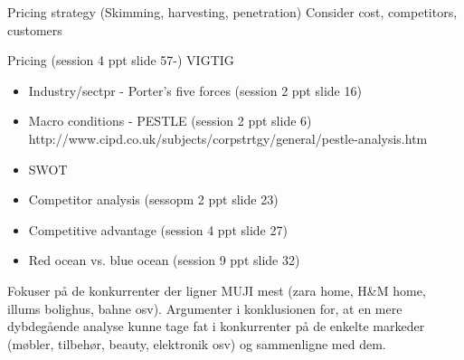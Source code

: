 Pricing strategy (Skimming, harvesting, penetration)
Consider cost, competitors, customers 


Pricing (session 4 ppt slide 57-) VIGTIG

\begin{itemize}  
\item 
Industry/sectpr - Porter's five forces (session 2 ppt slide 16)
\item 
Macro conditions - PESTLE (session 2 ppt slide 6)
\\http://www.cipd.co.uk/subjects/corpstrtgy/general/pestle-analysis.htm 
\item 
SWOT
\item
Competitor analysis (sessopm 2 ppt slide 23)
\item
Competitive advantage (session 4 ppt slide 27)
\item
Red ocean vs. blue ocean (session 9 ppt slide 32)


\end{itemize}

Fokuser på de konkurrenter der ligner MUJI mest (zara home, H&M home, illums bolighus, bahne osv). Argumenter i konklusionen for, at en mere dybdegående analyse kunne tage fat i konkurrenter på de enkelte markeder (møbler, tilbehør, beauty, elektronik osv) og sammenligne med dem. 